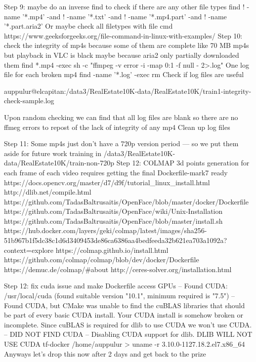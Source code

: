 Step 9: maybe do an inverse find to check if there are any other file types
find ! -name '*.mp4' -and ! -name '*.txt' -and ! -name '*.mp4.part' -and ! -name '*.part.aria2'
Or maybe check all filetypes with file cmd
https://www.geeksforgeeks.org/file-command-in-linux-with-examples/
Step 10: check the integrity of mp4s because some of them are complete like 70 MB mp4s but playback in VLC is black maybe because aria2 only partially downloaded them
find *.mp4 -exec sh -c "ffmpeg -v error -i {} -map 0:1 -f null - 2>{}.log" \;
One log file for each broken mp4
find -name '*.log' -exec rm {} \;
Check if log files are useful


auppulur@elcapitan:/data3/RealEstate10K-data/RealEstate10K/train1-integrity-check-sample.log


Upon random checking we can find that all log files are blank so there are no ffmeg errors to repost of the lack of integrity of any mp4 
Clean up log files
 

Step 11: Some mp4s just don’t have a 720p version period — so we put them aside for future work training in /data3/RealEstate10K-data/RealEstate10K/train-non-720p
Step 12: COLMAP 3d points generation for each frame of each video requires getting the final Dockerfile-mark7 ready
https://docs.opencv.org/master/d7/d9f/tutorial_linux_install.html
http://dlib.net/compile.html
https://github.com/TadasBaltrusaitis/OpenFace/blob/master/docker/Dockerfile
https://github.com/TadasBaltrusaitis/OpenFace/wiki/Unix-Installation
https://github.com/TadasBaltrusaitis/OpenFace/blob/master/install.sh
https://hub.docker.com/layers/geki/colmap/latest/images/sha256-51b967b1f5dc38c1d6d3409453de86ca6386aa4bedfeeda32b621ea703a1092a?context=explore
https://colmap.github.io/install.html
https://github.com/colmap/colmap/blob/dev/docker/Dockerfile
https://demuc.de/colmap/#about
http://ceres-solver.org/installation.html




  Step 12: fix cuda issue and make Dockerfile access GPUs
-- Found CUDA: /usr/local/cuda (found suitable version "10.1", minimum required is "7.5") 
-- Found CUDA, but CMake was unable to find the cuBLAS libraries that should be part of every basic CUDA install. Your CUDA install is somehow broken or incomplete. Since cuBLAS is required for dlib to use CUDA we won't use CUDA.
-- DID NOT FIND CUDA
-- Disabling CUDA support for dlib.  DLIB WILL NOT USE CUDA
tf-docker /home/auppulur > uname -r
3.10.0-1127.18.2.el7.x86_64
Anyways let's drop this now after 2 days and get back to the prize




